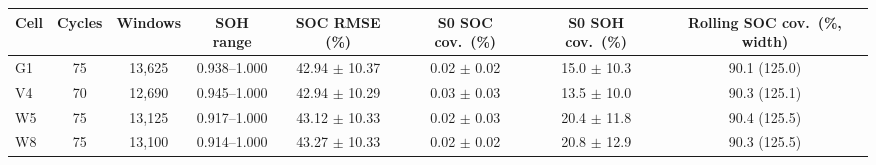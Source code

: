 \begin{tabular}{lccccccc}
\toprule
Cell & Cycles & Windows & SOH range & SOC RMSE (\%) & S0 SOC cov.\ (\%) & S0 SOH cov.\ (\%) & Rolling SOC cov.\ (\%, width) \\
\midrule
G1 & 75 & 13{,}625 & 0.938--1.000 & 42.94 $\pm$ 10.37 & 0.02 $\pm$ 0.02 & 15.0 $\pm$ 10.3 & 90.1 (125.0) \\
V4 & 70 & 12{,}690 & 0.945--1.000 & 42.94 $\pm$ 10.29 & 0.03 $\pm$ 0.03 & 13.5 $\pm$ 10.0 & 90.3 (125.1) \\
W5 & 75 & 13{,}125 & 0.917--1.000 & 43.12 $\pm$ 10.33 & 0.02 $\pm$ 0.03 & 20.4 $\pm$ 11.8 & 90.4 (125.5) \\
W8 & 75 & 13{,}100 & 0.914--1.000 & 43.27 $\pm$ 10.33 & 0.02 $\pm$ 0.02 & 20.8 $\pm$ 12.9 & 90.3 (125.5) \\
\bottomrule
\end{tabular}
